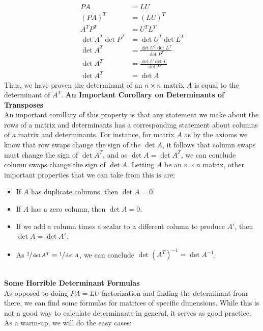 \documentclass[12pt]{amsart}
\begin{document}
\begin{align*}
	PA &= LU\\
	(PA)^T &= (LU)^T\\
	A^TP^T &= U^TL^T\\
	\det A^T \det P^T &= \det U^T \det L^T\\
	\det A^T &= \frac{\det U^T \det L^T}{\det P^T}\\
	\det A^T &= \frac{\det U \det L}{\det P}\\
	\det A^T &= \det A
\end{align*} \vspace{-1mm}
Thus, we have proven the determinant of an $n \times n$ matrix $A$ is equal to the determinant of $A^T$.
\textbf{An Important Corollary on Determinants of Transposes}\\
 An important corollary of this property is that any statement we make about the rows of a matrix and determinants has a corresponding statement about columns of a matrix and determinants. For instance, for matrix $A$ as by the axioms we know that row swaps change the sign of the $\det A$, it follows that column swaps must change the sign of $\det A^T$, and as $\det A = \det A^T$, we can conclude column swaps change the sign of $\det A$. Letting $A$ be an $n \times n$ matrix, other important properties that we can take from this is are:
 \begin{itemize}
 	\item If $A$ has duplicate columns, then $\det A = 0$.
 	\item If $A$ has a zero column, then $\det A = 0$.
 	\item If we add a column times a scalar to a different column to produce $A'$, then $\det A = \det A'$.
 	\item As $\sfrac{1}{\det A^T} = \sfrac{1}{\det A}$, we can conclude $\det (A^T)^{-1} = \det A^{-1}$.
 \end{itemize}\hfill
 \\
\textbf{Some Horrible Determinant Formulas}\\
As opposed to doing $PA=LU$ factorization and finding the determinant from there, we can find some formulas for matrices of specific dimensions. While this is not a good way to calculate determinants in general, it serves as good practice. As a warm-up, we will do the easy cases:\\
\end{document}
